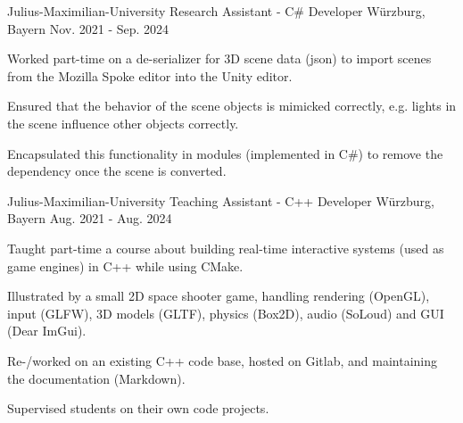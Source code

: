 

\begin{cventries}

  \cventry
    {Julius-Maximilian-University} %
    {Research Assistant - C\# Developer} %
    {Würzburg, Bayern} %
    {Nov. 2021 - Sep. 2024} %
    {
      \begin{cvitems} %
        \item {Worked part-time on a de-serializer for 3D scene data (json) to import scenes from the Mozilla Spoke editor into the Unity editor.}
        \item {Ensured that the behavior of the scene objects is mimicked correctly, e.g. lights in the scene influence other objects correctly.}
        \item {Encapsulated this functionality in modules (implemented in C\#) to remove the dependency once the scene is converted.}
      \end{cvitems}
    }

  \cventry
    {Julius-Maximilian-University} %
    {Teaching Assistant - C++ Developer} %
    {Würzburg, Bayern} %
    {Aug. 2021 - Aug. 2024} %
    {
      \begin{cvitems} %
        \item {Taught part-time a course about building real-time interactive systems (used as game engines) in C++ while using CMake.}
        \item {Illustrated by a small 2D space shooter game, handling rendering (OpenGL), input (GLFW), 3D models (GLTF), physics (Box2D), audio (SoLoud) and GUI (Dear ImGui).}
        \item {Re-/worked on an existing C++ code base, hosted on Gitlab, and maintaining the documentation (Markdown).}
        \item {Supervised students on their own code projects.}
      \end{cvitems}
    }
  

\end{cventries}
